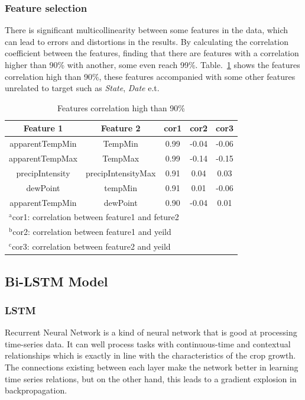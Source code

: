 \documentclass[conference, a4paper]{IEEEtran}
\begin{document}
    \subsubsection{Feature selection}
      There is significant multicollinearity between some features in the data, which can lead to errors and distortions in the results\cite{farrar1967multicollinearity}. By calculating the correlation coefficient between the features, finding that there are features with a correlation higher than 90\% with another, some even reach 99\%. Table.~\ref{tab:correlation} shows the features correlation high than 90\%, these features accompanied with some other features unrelated to target such as \textit{State}, \textit{Date} e.t.
      \begin{table}[htbp]
        \caption{Features correlation high than 90\%}
        \begin{center}
          \begin{tabular}{|c|c|c|c|c|}
            \hline
            Feature 1 & Feature 2 & cor1 & cor2 & cor3\\
            \hline
            apparentTempMin & TempMin     & 0.99 & -0.04 & -0.06 \\
            apparentTempMax & TempMax     & 0.99 & -0.14 & -0.15 \\
            precipIntensity & precipIntensityMax & 0.91 & 0.04  & 0.03  \\
            dewPoint & tempMin & 0.91 & 0.01  & -0.06 \\
            apparentTempMin & dewPoint & 0.90 & -0.04 & 0.01 \\
            \hline
            \multicolumn{5}{l}{$^{\mathrm{a}}$cor1: correlation between feature1 and feture2} \\
            \multicolumn{5}{l}{$^{\mathrm{b}}$cor2: correlation between feature1 and yeild} \\ 
            \multicolumn{5}{l}{$^{\mathrm{c}}$cor3: correlation between feature2 and yeild} \\
          \end{tabular}
          \label{tab:correlation}
        \end{center}
      \end{table}




  \subsection{Bi-LSTM Model}
    \subsubsection{LSTM}
      Recurrent Neural Network is a kind of neural network that is good at processing time-series data. It can well process tasks with continuous-time and contextual relationships which is exactly in line with the characteristics of the crop growth. The connections existing between each layer make the network better in learning time series relations, but on the other hand, this leads to a gradient explosion in backpropagation. \cite{hochreiter1997long}
\end{document}
